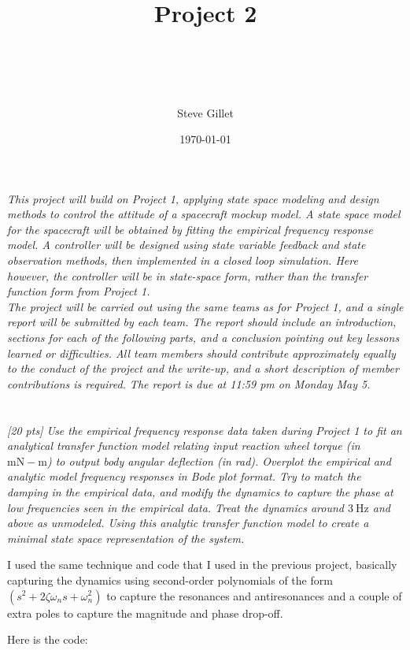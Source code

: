 \documentclass{article}
\title{Project 2 \\ \className \\ \professorName \\ \taName}
\author{Steve Gillet}
\date{\today}
\begin{document}
\maketitle

\textit{This project will build on Project 1, applying state space modeling and design methods to control the attitude of a spacecraft mockup model. A state space model for the spacecraft will be obtained by fitting the empirical frequency response model. A controller will be designed using state variable feedback and state observation methods, then implemented in a closed loop simulation. Here however, the controller will be in state-space form, rather than the transfer function form from Project 1.} \\
\textit{The project will be carried out using the same teams as for Project 1, and a single report will be submitted by each team. The report should include an introduction, sections for each of the following parts, and a conclusion pointing out key lessons learned or difficulties. All team members should contribute approximately equally to the conduct of the project and the write-up, and a short description of member contributions is required. The report is due at 11:59 pm on Monday May 5.}

\section{}
\textit{[20 pts] Use the empirical frequency response data taken during Project 1 to fit an analytical transfer function model relating input reaction wheel torque (in $\mathrm{mN}-\mathrm{m}$) to output body angular deflection (in rad). Overplot the empirical and analytic model frequency responses in Bode plot format. Try to match the damping in the empirical data, and modify the dynamics to capture the phase at low frequencies seen in the empirical data. Treat the dynamics around $3 \mathrm{~Hz}$ and above as unmodeled. Using this analytic transfer function model to create a minimal state space representation of the system.}

I used the same technique and code that I used in the previous project, basically capturing the dynamics using second-order polynomials of the form \((s^2 + 2\zeta\omega_n s + \omega_n^2)\) to capture the resonances and antiresonances and a couple of extra poles to capture the magnitude and phase drop-off.

Here is the code:
\end{document}
